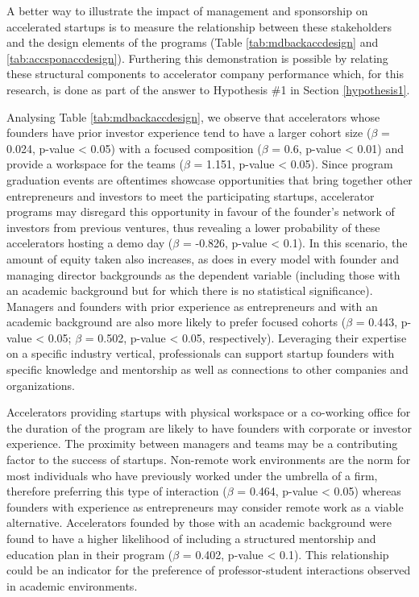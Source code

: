 \documentclass[
  12pt,
]{article}
\begin{document}

A better way to illustrate the impact of management and sponsorship on accelerated startups is to measure the relationship between these stakeholders and the design elements of the programs (Table \ref{tab:mdbackaccdesign} and \ref{tab:accsponaccdesign}). Furthering this demonstration is possible by relating these structural components to accelerator company performance which, for this research, is done as part of the answer to Hypothesis \#1 in Section \ref{hypothesis1}.

Analysing Table \ref{tab:mdbackaccdesign}, we observe that accelerators whose founders have prior investor experience tend to have a larger cohort size (\(\beta\) = 0.024, p-value \textless{} 0.05) with a focused composition (\(\beta\) = 0.6, p-value \textless{} 0.01) and provide a workspace for the teams (\(\beta\) = 1.151, p-value \textless{} 0.05). Since program graduation events are oftentimes showcase opportunities that bring together other entrepreneurs and investors to meet the participating startups, accelerator programs may disregard this opportunity in favour of the founder's network of investors from previous ventures, thus revealing a lower probability of these accelerators hosting a demo day (\(\beta\) = -0.826, p-value \textless{} 0.1). In this scenario, the amount of equity taken also increases, as does in every model with founder and managing director backgrounds as the dependent variable (including those with an academic background but for which there is no statistical significance). Managers and founders with prior experience as entrepreneurs and with an academic background are also more likely to prefer focused cohorts (\(\beta\) = 0.443, p-value \textless{} 0.05; \(\beta\) = 0.502, p-value \textless{} 0.05, respectively). Leveraging their expertise on a specific industry vertical, professionals can support startup founders with specific knowledge and mentorship as well as connections to other companies and organizations.

Accelerators providing startups with physical workspace or a co-working office for the duration of the program are likely to have founders with corporate or investor experience. The proximity between managers and teams may be a contributing factor to the success of startups. Non-remote work environments are the norm for most individuals who have previously worked under the umbrella of a firm, therefore preferring this type of interaction (\(\beta\) = 0.464, p-value \textless{} 0.05) whereas founders with experience as entrepreneurs may consider remote work as a viable alternative. Accelerators founded by those with an academic background were found to have a higher likelihood of including a structured mentorship and education plan in their program (\(\beta\) = 0.402, p-value \textless{} 0.1). This relationship could be an indicator for the preference of professor-student interactions observed in academic environments.
\end{document}
